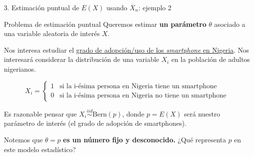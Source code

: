 \documentclass{beamer}
\theoremstyle{definition}
\begin{document}
\begin{frame}{\color{rosee}3. Estimaci\'on puntual de $E(X)$ usando $\overline{X}_n$: ejemplo 2} 

  \begin{block}{Problema de estimaci\'on puntual}\small
\small{Queremos estimar \textbf{un par\'ametro} $\theta$ asociado a
    una variable aleatoria de inter\'es $X$}.
  \end{block}

 

  \small{Nos interesa estudiar el  \href{https://www.businessinsider.com/smartphone-adoption-on-the-upswing-in-nigeria-2017-4}{grado de adopción/uso de los \textit{smartphone} en Nigeria}. Nos interesará considerar la distribución de una variable $X_i$ en la poblaci\'on de adultos nigerianos.

   \begin{equation*}
    X_{i} =\begin{cases}
      1 & \text{si la i-\'esima persona en Nigeria tiene un smartphone}\\
      0 & \text{si la i-\'esima persona en Nigeria no tiene un smartphone}
    \end{cases}
    \end{equation*}
    
  Es razonable pensar que $X_i\stackrel{iid}{\sim} \text{Bern}(p)$, donde $p=E(X)$ será nuestro parámetro de interés (el grado de adopción de smartphones).}
  
 \small{Notemos que $\theta=p$ \textbf{es un n\'umero fijo y desconocido.} ¿Qué representa $p$ en este modelo estadístico}?
  

  

\end{frame}
\end{document}
